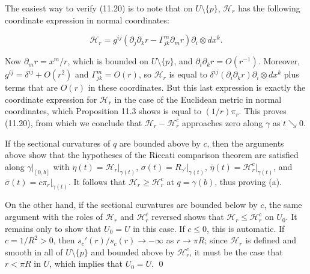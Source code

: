 The easiest way to verify (11.20) is to note that on $U \setminus \{p\}$, $\mathcal{H}_r$ has the following coordinate expression in normal coordinates:

\[
\mathcal{H}_r = g^{ij}\left(\partial_j \partial_k r - \Gamma_{jk}^m \partial_m r\right)\partial_i \otimes dx^k.
\]

Now $\partial_m r = x^m/r$, which is bounded on $U \setminus \{p\}$, and $\partial_i\partial_k r = O(r^{-1})$. Moreover, $g^{ij} = \delta^{ij} + O(r^2)$ and $\Gamma_{jk}^m = O(r)$, so $\mathcal{H}_r$ is equal to $\delta^{ij}(\partial_i\partial_k r)\partial_i \otimes dx^k$ plus terms that are $O(r)$ in these coordinates. But this last expression is exactly the coordinate expression for $\mathcal{H}_r$ in the case of the Euclidean metric in normal coordinates, which Proposition 11.3 shows is equal to $(1/r)\pi_r$. This proves (11.20), from which we conclude that $\mathcal{H}_r - \mathcal{H}_r^c$ approaches zero along $\gamma$ as $t \searrow 0$.

If the sectional curvatures of $q$ are bounded above by $c$, then the arguments above show that the hypotheses of the Riccati comparison theorem are satisfied along $\gamma|_{[0,b]}$ with $\eta(t) = \mathcal{H}_r|_{\gamma(t)}$, $\sigma(t) = R_{\gamma'}|_{\gamma(t)}$, $\bar{\eta}(t) = \mathcal{H}_r^c|_{\gamma(t)}$, and $\bar{\sigma}(t) = c\pi_r|_{\gamma(t)}$. It follows that $\mathcal{H}_r \geq \mathcal{H}_r^c$ at $q = \gamma(b)$, thus proving (a).

On the other hand, if the sectional curvatures are bounded below by $c$, the same argument with the roles of $\mathcal{H}_r$ and $\mathcal{H}_r^c$ reversed shows that $\mathcal{H}_r \leq \mathcal{H}_r^c$ on $U_0$. It remains only to show that $U_0 = U$ in this case. If $c \leq 0$, this is automatic. If $c = 1/R^2 > 0$, then $s_c'(r)/s_c(r) \to -\infty$ as $r \to \pi R$; since $\mathcal{H}_r$ is defined and smooth in all of $U \setminus \{p\}$ and bounded above by $\mathcal{H}_r^c$, it must be the case that $r < \pi R$ in $U$, which implies that $U_0 = U$. \qed

